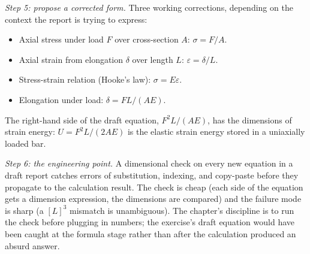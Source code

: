\begin{exercise}
\emph{Step 5: propose a corrected form.} Three working corrections,
depending on the context the report is trying to express:
\begin{itemize}[leftmargin=*]
  \item Axial stress under load $F$ over cross-section $A$:
    $\sigma = F/A$.
  \item Axial strain from elongation $\delta$ over length $L$:
    $\varepsilon = \delta/L$.
  \item Stress-strain relation (Hooke's law): $\sigma = E\varepsilon$.
  \item Elongation under load: $\delta = FL/(AE)$.
\end{itemize}
The right-hand side of the draft equation, $F^{2}L/(AE)$, has the
dimensions of strain energy: $U = F^{2}L/(2AE)$ is the elastic
strain energy stored in a uniaxially loaded bar.

\emph{Step 6: the engineering point.} A dimensional check on every
new equation in a draft report catches errors of substitution,
indexing, and copy-paste before they propagate to the calculation
result. The check is cheap (each side of the equation gets a
dimension expression, the dimensions are compared) and the failure
mode is sharp (a $[L]^{3}$ mismatch is unambiguous). The chapter's
discipline is to run the check before plugging in numbers; the
exercise's draft equation would have been caught at the formula
stage rather than after the calculation produced an absurd answer.
\end{exercise}

